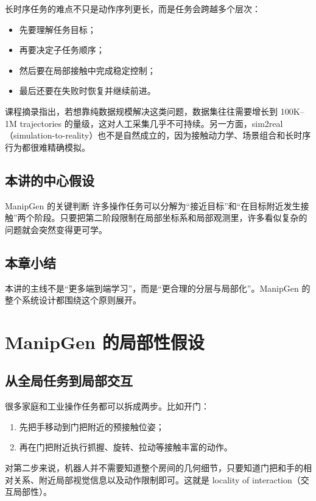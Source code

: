 \documentclass[a4paper]{article}
\begin{document}
长时序任务的难点不只是动作序列更长，而是任务会跨越多个层次：
\begin{itemize}
  \item 先要理解任务目标；
  \item 再要决定子任务顺序；
  \item 然后要在局部接触中完成稳定控制；
  \item 最后还要在失败时恢复并继续前进。
\end{itemize}

课程摘录指出，若想靠纯数据规模解决这类问题，数据集往往需要增长到 100K--1M trajectories 的量级，这对人工采集几乎不可持续。另一方面，sim2real（simulation-to-reality）也不是自然成立的，因为接触动力学、场景组合和长时序行为都很难精确模拟。

\subsection{本讲的中心假设}

\begin{importantbox}{ManipGen 的关键判断}
许多操作任务可以分解为“接近目标”和“在目标附近发生接触”两个阶段。只要把第二阶段限制在局部坐标系和局部观测里，许多看似复杂的问题就会突然变得更可学。
\end{importantbox}

\subsection{本章小结}

本讲的主线不是“更多端到端学习”，而是“更合理的分层与局部化”。ManipGen 的整个系统设计都围绕这个原则展开。

\section{ManipGen 的局部性假设}

\subsection{从全局任务到局部交互}

很多家庭和工业操作任务都可以拆成两步。比如开门：
\begin{enumerate}
  \item 先把手移动到门把附近的预接触位姿；
  \item 再在门把附近执行抓握、旋转、拉动等接触丰富的动作。
\end{enumerate}

对第二步来说，机器人并不需要知道整个房间的几何细节，只要知道门把和手的相对关系、附近局部视觉信息以及动作限制即可。这就是 locality of interaction（交互局部性）。
\end{document}
